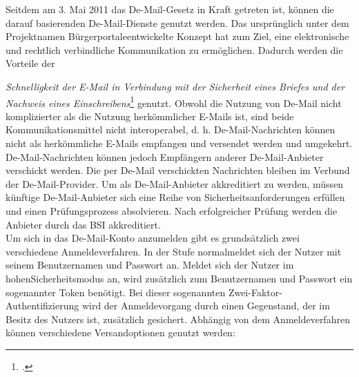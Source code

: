 \documentclass  [paper=a4,
				fontsize=12pt,
				listof=totoc,
				bibliography=totoc
				]{scrreprt}
\begin{document}
			Seitdem am 3. Mai 2011 das De-Mail-Gesetz in Kraft getreten ist, können die darauf basierenden De-Mail-Dienste genutzt werden.
			Das ursprünglich unter dem Projektnamen \glqq Bürgerportale\grqq entwickelte Konzept hat zum Ziel, eine elektronische und rechtlich verbindliche Kommunikation zu ermöglichen.
			Dadurch werden die Vorteile der {\textit{\glqq Schnelligkeit der E-Mail in Verbindung mit der Sicherheit eines Briefes und der Nachweis eines Einschreibens\grqq}\footcite[Vgl.][S. 8]{BSIDeMail} genutzt.
			Obwohl die Nutzung von De-Mail nicht komplizierter als die Nutzung herkömmlicher E-Mails ist, sind beide Kommunikationsmittel nicht interoperabel, d. h. De-Mail-Nachrichten können nicht als herkömmliche E-Mails empfangen und versendet werden und umgekehrt.
			De-Mail-Nachrichten können jedoch Empfängern anderer De-Mail-Anbieter verschickt werden.
			Die per De-Mail verschickten Nachrichten bleiben im Verbund der De-Mail-Provider.
			Um als De-Mail-Anbieter akkreditiert zu werden, müssen künftige De-Mail-Anbieter sich eine Reihe von Sicherheitsanforderungen erfüllen und einen Prüfungsprozess absolvieren.
			Nach erfolgreicher Prüfung werden die Anbieter durch das \ac{BSI} akkreditiert.\medskip\\
			
			Um sich in das De-Mail-Konto anzumelden gibt es grundsätzlich zwei verschiedene Anmeldeverfahren.
			In der Stufe \glqq normal\grqq meldet sich der Nutzer mit seinem Benutzernamen und Passwort an.
			Meldet sich der Nutzer im \glqq hohen\grqq Sicherheitsmodus an, wird zusätzlich zum Benutzernamen und Passwort ein sogenannter Token benötigt.
			Bei dieser sogenannten Zwei-Faktor-Authentifizierung wird der Anmeldevorgang durch einen Gegenstand, der im Besitz des Nutzers ist, zusätzlich gesichert.
			Abhängig von dem Anmeldeverfahren können verschiedene Versandoptionen genutzt werden:
			
}
\end{document}
